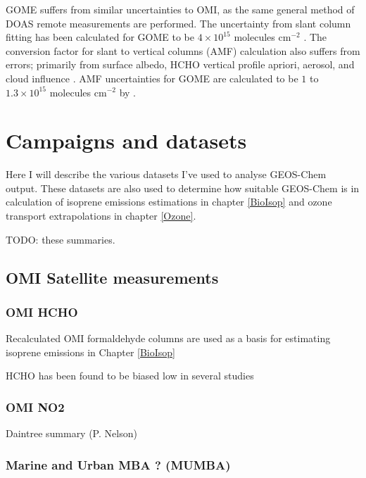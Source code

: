       GOME suffers from similar uncertainties to OMI, as the same general method of DOAS remote measurements are performed.
      The uncertainty from slant column fitting has been calculated for GOME to be $4\times10^{15}$ molecules cm$^{-2}$ \citep{Chance2000, Millet2006}. 
      The conversion factor for slant to vertical columns (AMF) calculation also suffers from errors; primarily from surface albedo, HCHO vertical profile apriori, aerosol, and cloud influence \citep{Millet2006}. 
      AMF uncertainties for GOME are calculated to be $1$ to $1.3\times10^{15}$ molecules cm$^{-2}$ by \cite{Shim2005}.
  

\section{Campaigns and datasets}
  \label{Model:Datasets}
  Here I will describe the various datasets I've used to analyse GEOS-Chem output.
  These datasets are also used to determine how suitable GEOS-Chem is in calculation of isoprene emissions estimations in chapter \ref{BioIsop} and ozone transport extrapolations in chapter \ref{Ozone}.
  
  TODO: these summaries.
  
  \subsection{OMI Satellite measurements}
  \label{Model:Datasets:OMI}
  
    \subsubsection{OMI HCHO}
    Recalculated OMI formaldehyde columns are used as a basis for estimating isoprene emissions in Chapter \ref{BioIsop}
    
    HCHO has been found to be biased low in several studies \cite[eg.][]{Zhu2016,DeSmedt2015,Barkley2013}
  
    \subsubsection{OMI NO2}
    \label{Model:Datasets:OMNO2d}

  Daintree summary (P. Nelson)
  
  \subsubsection{Marine and Urban MBA ? (MUMBA)}
    \label{Model:Datasets:MUMBA}
  
